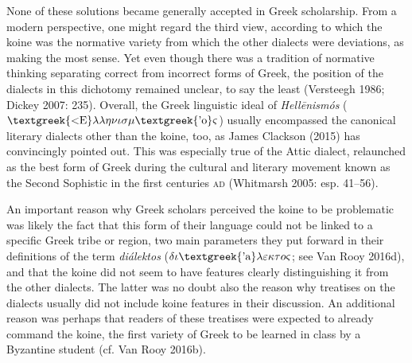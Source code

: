 \begin{styleStandard}
None of these solutions became generally accepted in Greek scholarship. From a modern perspective, one might regard the third view, according to which the koine was the normative variety from which the other dialects were deviations, as making the most sense. Yet even though there was a tradition of normative thinking separating correct from incorrect forms of Greek, the position of the dialects in this dichotomy remained unclear, to say the least (Versteegh 1986; Dickey 2007: 235). Overall, the Greek linguistic ideal of \textit{Hell\=enismós} ($\text{\textgreek{<E}}\lambda \lambda \eta \nu \iota \sigma \mu \text{\textgreek{'o}}\varsigma $) usually encompassed the canonical literary dialects other than the koine, too, as James Clackson (2015) has convincingly pointed out. This was especially true of the Attic dialect, relaunched as the best form of Greek during the cultural and literary movement known as the Second Sophistic in the first centuries \textsc{ad} (Whitmarsh 2005: esp. 41–56).
\end{styleStandard}

\begin{styleStandard}
An important reason why Greek scholars perceived the koine to be problematic was likely the fact that this form of their language could not be linked to a specific Greek tribe or region, two main parameters they put forward in their definitions of the term \textit{diálektos} ($\delta \iota \text{\textgreek{'a}}\lambda \varepsilon \kappa \tau o\varsigma $; see Van Rooy 2016d), and that the koine did not seem to have features clearly distinguishing it from the other dialects. The latter was no doubt also the reason why treatises on the dialects usually did not include koine features in their discussion. An additional reason was perhaps that readers of these treatises were expected to already command the koine, the first variety of Greek to be learned in class by a Byzantine student (cf. Van Rooy 2016b).
\end{styleStandard}

